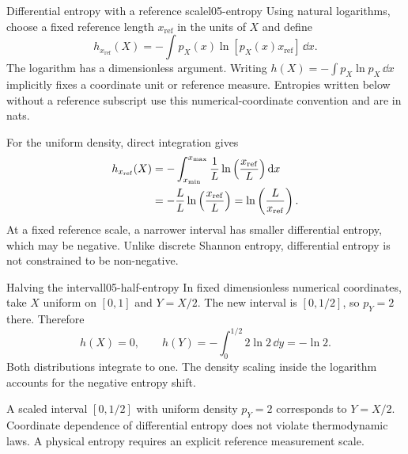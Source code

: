 \begin{definition}{Differential entropy with a reference scale}{l05-entropy}
Using natural logarithms, choose a fixed reference length $x_{\mathrm{ref}}$ in the units of $X$ and define
\begin{equation}
h_{x_{\mathrm{ref}}}(X)=-\int p_X(x)
\ln[p_X(x)x_{\mathrm{ref}}]\,\dd x.
\label{eq:l05-reference-entropy}
\end{equation}
The logarithm has a dimensionless argument. Writing $h(X)=-\int p_X\ln p_X\,\dd x$ implicitly fixes a coordinate unit or reference measure. Entropies written below without a reference subscript use this numerical-coordinate convention and are in nats.
\end{definition}
For the uniform density, direct integration gives
\begin{align}
h_{x_{\mathrm{ref}}}(X)
&=-\int_{x_{\min}}^{x_{\max}}\frac1L
      \ln\left(\frac{x_{\mathrm{ref}}}{L}\right)\mathrm{d} x \notag\\
&=-\frac{L}{L}\ln\left(\frac{x_{\mathrm{ref}}}{L}\right)
=\ln\left(\frac{L}{x_{\mathrm{ref}}}\right).
\label{eq:l05-uniform-entropy}
\end{align}
At a fixed reference scale, a narrower interval has smaller differential entropy, which may be negative. Unlike discrete Shannon entropy, differential entropy is not constrained to be non-negative.

\begin{example}{Halving the interval}{l05-half-entropy}
In fixed dimensionless numerical coordinates, take $X$ uniform on $[0,1]$ and $Y=X/2$. The new interval is $[0,1/2]$, so $p_Y=2$ there. Therefore
\begin{equation}
h(X)=0,\qquad
h(Y)=-\int_0^{1/2}2\ln2\,\dd y=-\ln2.
\label{eq:l05-half-entropy}
\end{equation}
Both distributions integrate to one. The density scaling inside the logarithm accounts for the negative entropy shift.
\end{example}
\begin{remark}
A scaled interval $[0, 1/2]$ with uniform density $p_Y=2$ corresponds to $Y=X/2$. Coordinate dependence of differential entropy does not violate thermodynamic laws. A physical entropy requires an explicit reference measurement scale.
\end{remark}

